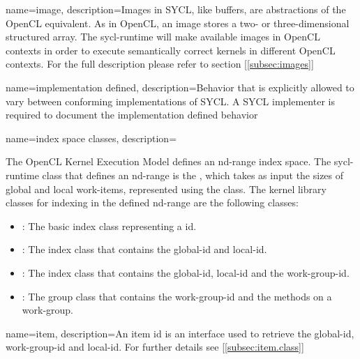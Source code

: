 {
  name=image,
  description={Images in SYCL, like buffers, are abstractions of the OpenCL
               equivalent. As in OpenCL, an image stores a two- or
               three-dimensional structured array. The \gls{sycl-runtime} will make
               available images in OpenCL contexts in order to execute
               semantically correct kernels in different OpenCL contexts.
               For the full description please refer to section [\ref{subsec:images}]}
}

{
  name={implementation defined},
  description={Behavior that is explicitly allowed to vary between
               conforming implementations of SYCL. A SYCL
               implementer is required to document the
               implementation defined behavior}
}

{
  name={index space classes},
  description={The OpenCL Kernel Execution Model defines an nd-range index
              space. The \gls{sycl-runtime} class that defines an nd-range is the 
              , which takes as input the sizes
              of global and local work-items, represented using the 
               class. The kernel library classes
              for indexing in the defined nd-range are the following classes: 
              \begin{itemize}
              \item {} : The basic index class 
                 representing a \gls{id}. 
              \item {} : The index class that contains
                 the \gls{global-id} and \gls{local-id}. 
              \item {} : The index class that
                 contains the \gls{global-id}, \gls{local-id} and the
                 \gls{work-group-id}.
              \item {} : The group class that contains
                 the \gls{work-group-id} and the methods on a work-group.
              \end{itemize}
              \nopostdesc
             }
}

{
  name={item},
  description={An item id is an interface used to retrieve the \gls{global-id},
        \gls{work-group-id} and \gls{local-id}. For further details see
              [\ref{subsec:item.class}]}
}

